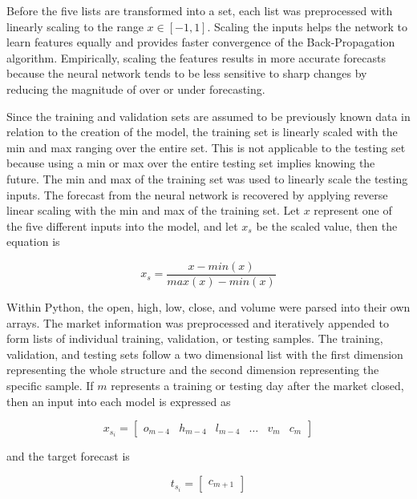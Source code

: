 \documentclass{ncjms}
\begin{document}
	Before the five lists are transformed into a set, each list was preprocessed with linearly scaling to the range $x \in [-1,1]$.
	Scaling the inputs helps the network to learn features equally and provides faster convergence of the Back-Propagation algorithm.
	Empirically, scaling the features results in more accurate forecasts because the neural network tends to be less sensitive to sharp changes by reducing the magnitude of over or under forecasting.

	Since the training and validation sets are assumed to be previously known data in relation to the creation of the model, the training set is linearly scaled with the min and max ranging over the entire set.
	This is not applicable to the testing set because using a min or max over the entire testing set implies knowing the future.
	The min and max of the training set was used to linearly scale the testing inputs.
	The forecast from the neural network is recovered by applying reverse linear scaling with the min and max of the training set.
	Let $x$ represent one of the five different inputs into the model, and let $x_s$ be the scaled value, then the equation is

	\begin{equation}
		x_s = \dfrac{x-min(x)}{max(x)-min(x)}
	\end{equation}

	Within Python, the open, high, low, close, and volume were parsed into their own arrays.
	The market information was preprocessed and iteratively appended to form lists of individual training, validation, or testing samples.
	The training, validation, and testing sets follow a two dimensional list with the first dimension representing the whole structure and the second dimension representing the specific sample.
	If $m$ represents a training or testing day after the market closed, then an input into each model is expressed as

	\begin{equation}
		x_{s_i} =
		\begin{bmatrix}
			o_{m-4} & h_{m-4} & l_{m-4} & \dots & v_m & c_m
		\end{bmatrix}
	\end{equation}

	and the target forecast is

	\begin{equation}
		t_{s_i} =
		\begin{bmatrix}
			c_{m+1}
		\end{bmatrix}
	\end{equation}
\end{document}
